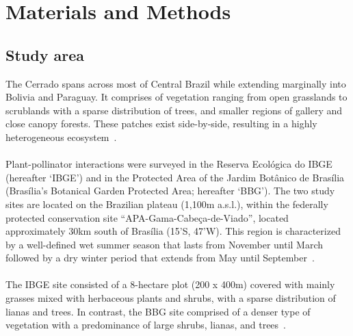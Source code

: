 \documentclass[11pt]{article}
\begin{document}
\newpage
\section{Materials and Methods} %
\subsection{Study area}
The Cerrado spans across most of Central Brazil while extending marginally into Bolivia and Paraguay. It comprises of vegetation ranging from open grasslands to scrublands with a sparse distribution of trees, and smaller regions of gallery and close canopy forests. These patches exist side-by-side, resulting in a highly heterogeneous ecosystem~\citep{Gottsberger2006}. \\
\\
Plant-pollinator interactions were surveyed in the Reserva Ecol\'ogica do IBGE (hereafter `IBGE') and in the Protected Area of the Jardim Bot\^anico de Bras\'ilia (Bras\'ilia's Botanical Garden Protected Area; hereafter `BBG'). The two study sites are located on the Brazilian plateau (1,100m a.s.l.), within the federally protected conservation site ``APA-Gama-Cabe\c ca-de-Viado'', located approximately 30km south of Bras\'ilia (15'S, 47'W). This region is characterized by a well-defined wet summer season that lasts from November until March followed by a dry winter period that extends from May until September~\citep{Gottsberger2006a}.\\
\\
The IBGE site consisted of a 8-hectare plot (200 x 400m) covered with mainly grasses mixed with herbaceous plants and shrubs, with a sparse distribution of lianas and trees. In contrast, the BBG site comprised of a denser type of vegetation with a predominance of large shrubs, lianas, and trees~\citep{Eiten1972}.
\end{document}
